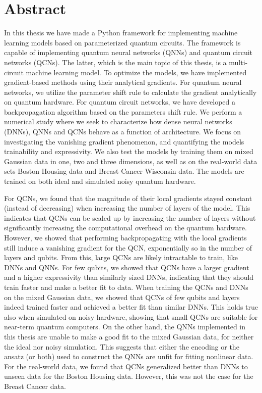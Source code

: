 \chapter*{Abstract}
\thispagestyle{plain}

In this thesis we have made a Python framework for implementing machine learning models based on parameterized quantum circuits. The framework is capable of implementing quantum neural networks (QNNs) and quantum circuit networks (QCNs). The latter, which is the main topic of this thesis, is a multi-circuit machine learning model. To optimize the models, we have implemented gradient-based methods using their analytical gradients. For quantum neural networks, we utilize the parameter shift rule to calculate the gradient analytically on quantum hardware. For quantum circuit networks, we have developed a backpropagation algorithm based on the parameters shift rule. We perform a numerical study where we seek to characterize how dense neural networks (DNNs), QNNs and QCNs behave as a function of architecture. We focus on investigating the vanishing gradient phenomenon, and quantifying the models trainability and expressivity. We also test the models by training them on mixed Gaussian data in one, two and three dimensions, as well as on the real-world data sets Boston Housing data and Breast Cancer Wisconsin data. The models are trained on both ideal and simulated noisy quantum hardware.

For QCNs, we found that the magnitude of their local gradients stayed constant (instead of decreasing) when increasing the number of layers of the model. This indicates that QCNs can be scaled up by increasing the number of layers without significantly increasing the computational overhead on the quantum hardware. However, we showed that performing backpropagating with the local gradients still induce a vanishing gradient for the QCN, exponentially so in the number of layers and qubits. From this, large QCNs are likely intractable to train, like DNNs and QNNs. For few qubits, we showed that QCNs have a larger gradient and a higher expressivity than similarly sized DNNs, indicating that they should train faster and make a better fit to data. When training the QCNs and DNNs on the mixed Gaussian data, we showed that QCNs of few qubits and layers indeed trained faster and achieved a better fit than similar DNNs. This holds true also when simulated on noisy hardware, showing that small QCNs are suitable for near-term quantum computers. On the other hand, the QNNs implemented in this thesis are unable to make a good fit to the mixed Gaussian data, for neither the ideal nor noisy simulation. This suggests that either the encoding or the ansatz (or both) used to construct the QNNs are unfit for fitting nonlinear data. For the real-world data, we found that QCNs generalized better than DNNs to unseen data for the Boston Housing data. However, this was not the case for the Breast Cancer data.
